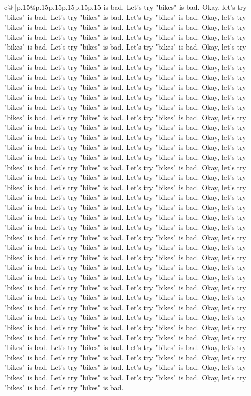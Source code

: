 \documentclass{article}
\begin{document}
{\begin{supertabular}{c@{$\;$}|p{.15\linewidth}@{}p{.15\linewidth}p{.15\linewidth}p{.15\linewidth}p{.15\linewidth}p{.15\linewidth}}
{{{is bad. Let's try "bikes" is bad. Okay, let's try "bikes" is bad. Let's try "bikes" is bad. Let's try "bikes" is bad. Okay, let's try "bikes" is bad. Let's try "bikes" is bad. Let's try "bikes" is bad. Okay, let's try "bikes" is bad. Let's try "bikes" is bad. Let's try "bikes" is bad. Okay, let's try "bikes" is bad. Let's try "bikes" is bad. Let's try "bikes" is bad. Okay, let's try "bikes" is bad. Let's try "bikes" is bad. Let's try "bikes" is bad. Okay, let's try "bikes" is bad. Let's try "bikes" is bad. Let's try "bikes" is bad. Okay, let's try "bikes" is bad. Let's try "bikes" is bad. Let's try "bikes" is bad. Okay, let's try "bikes" is bad. Let's try "bikes" is bad. Let's try "bikes" is bad. Okay, let's try "bikes" is bad. Let's try "bikes" is bad. Let's try "bikes" is bad. Okay, let's try "bikes" is bad. Let's try "bikes" is bad. Let's try "bikes" is bad. Okay, let's try "bikes" is bad. Let's try "bikes" is bad. Let's try "bikes" is bad. Okay, let's try "bikes" is bad. Let's try "bikes" is bad. Let's try "bikes" is bad. Okay, let's try "bikes" is bad. Let's try "bikes" is bad. Let's try "bikes" is bad. Okay, let's try "bikes" is bad. Let's try "bikes" is bad. Let's try "bikes" is bad. Okay, let's try "bikes" is bad. Let's try "bikes" is bad. Let's try "bikes" is bad. Okay, let's try "bikes" is bad. Let's try "bikes" is bad. Let's try "bikes" is bad. Okay, let's try "bikes" is bad. Let's try "bikes" is bad. Let's try "bikes" is bad. Okay, let's try "bikes" is bad. Let's try "bikes" is bad. Let's try "bikes" is bad. Okay, let's try "bikes" is bad. Let's try "bikes" is bad. Let's try "bikes" is bad. Okay, let's try "bikes" is bad. Let's try "bikes" is bad. Let's try "bikes" is bad. Okay, let's try "bikes" is bad. Let's try "bikes" is bad. Let's try "bikes" is bad. Okay, let's try "bikes" is bad. Let's try "bikes" is bad. Let's try "bikes" is bad. Okay, let's try "bikes" is bad. Let's try "bikes" is bad. Let's try "bikes" is bad. Okay, let's try "bikes" is bad. Let's try "bikes" is bad. Let's try "bikes" is bad. Okay, let's try "bikes" is bad. Let's try "bikes" is bad. Let's try "bikes" is bad. Okay, let's try "bikes" is bad. Let's try "bikes" is bad. Let's try "bikes" is bad. Okay, let's try "bikes" is bad. Let's try "bikes" is bad. Let's try "bikes" is bad. Okay, let's try "bikes" is bad. Let's try "bikes" is bad. Let's try "bikes" is bad. Okay, let's try "bikes" is bad. Let's try "bikes" is bad. Let's try "bikes" is bad. Okay, let's try "bikes" is bad. Let's try "bikes" is bad. Let's try "bikes" is bad. Okay, let's try "bikes" is bad. Let's try "bikes" is bad. Let's try "bikes" is bad. Okay, let's try "bikes" is bad. Let's try "bikes" is bad. Let's try "bikes" is bad. Okay, let's try "bikes" is bad. Let's try "bikes" is bad. Let's try "bikes" is bad. Okay, let's try "bikes" is bad. Let's try "bikes" is bad. Let's try "bikes" is bad. Okay, let's try "bikes" is bad. Let's try "bikes" is bad. Let's try "bikes" is bad. Okay, let's try "bikes" is bad. Let's try "bikes" is bad. Let's try "bikes" is bad. Okay, let's try "bikes" is bad. Let's try "bikes" is bad. Let's try "bikes" is bad. Okay, let's try "bikes" is bad. Let's try "bikes" is bad. }}}
\end{supertabular}}
\end{document}
